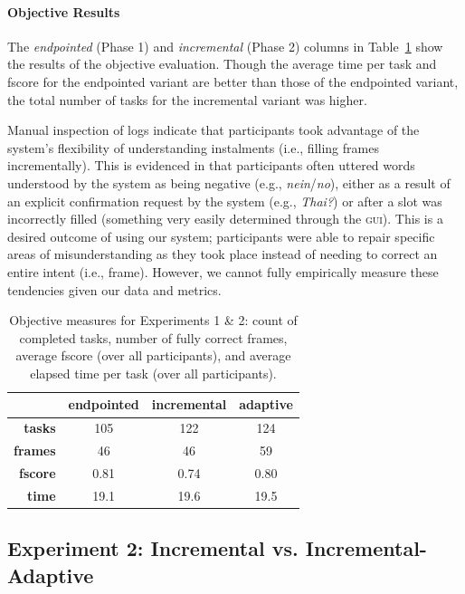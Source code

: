 \documentclass[11pt]{article}
\newcommand{\ui}[0]{\textsc{gui}}
\begin{document}
\paragraph{Objective Results}  The \emph{endpointed} (Phase 1) and \emph{incremental} (Phase 2) columns in Table~\ref{tab:objscores} show the results of the objective evaluation. Though the average time per task and fscore for the endpointed variant are better than those of the endpointed variant, the total number of tasks for the incremental variant was higher. 

Manual inspection of logs indicate that participants took advantage of the system's flexibility of understanding instalments (i.e., filling frames incrementally). This is evidenced in that participants often uttered words understood by the system as being negative (e.g., \emph{nein}/\emph{no}), either as a result of an explicit confirmation request by the system (e.g., \emph{Thai?}) or after a slot was incorrectly filled (something very easily determined through the \ui). This is a desired outcome of using our system; participants were able to repair specific areas of misunderstanding as they took place instead of needing to correct an entire intent (i.e., frame). However, we cannot fully empirically measure these tendencies given our data and metrics. 

\begin{table}
 \begin{tabular}{|r|c|c|c|}
\hline
                     & \textbf{endpointed} & \textbf{incremental} & \textbf{adaptive} \\
\hline
\textbf{tasks} & 105 & 122 & 124  \\
\textbf{frames} & 46 & 46 & 59 \\
\textbf{fscore} & 0.81 & 0.74 & 0.80 \\
\textbf{time} & 19.1 & 19.6 & 19.5 \\
 \hline
\end{tabular}
\caption{Objective measures for Experiments 1 \& 2: count of completed tasks, number of fully correct frames, average fscore (over all participants), and average elapsed time per task (over all participants).}
\label{tab:objscores}
\end{table}

\subsection{Experiment 2: Incremental vs. Incremental-Adaptive}
\label{section:exp2}
\end{document}
